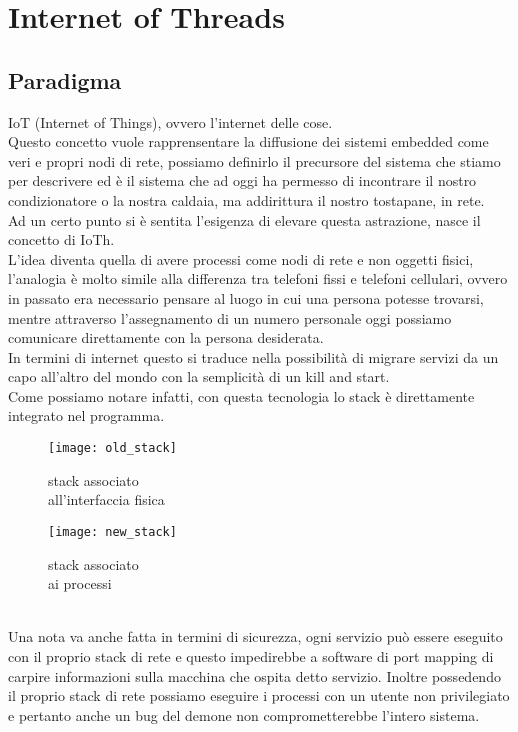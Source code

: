\chapter{Internet of Threads}                %
\lhead[\fancyplain{}{\bfseries\thepage}]{\fancyplain{}{\bfseries\rightmark}}
\section{Paradigma}                 %
IoT (Internet of Things), ovvero l'internet delle cose.\\
Questo concetto vuole rapprensentare la diffusione dei sistemi embedded come veri e propri nodi di rete, possiamo definirlo il precursore del sistema che stiamo per descrivere ed \`e il sistema che ad oggi ha permesso di incontrare il nostro condizionatore o la nostra caldaia, ma addirittura il nostro tostapane, in rete.\\
Ad un certo punto si \`e sentita l'esigenza di elevare questa astrazione, nasce il concetto di IoTh.\\
L'idea diventa quella di avere processi come nodi di rete e non oggetti fisici, l'analogia \`e molto simile alla differenza tra telefoni fissi e telefoni cellulari, ovvero in passato era necessario pensare al luogo in cui una persona potesse trovarsi, mentre attraverso l'assegnamento di un numero personale oggi possiamo comunicare direttamente con la persona desiderata\cite{K1,K2}.\\
In termini di internet questo si traduce nella possibilit\`a di migrare servizi da un capo all'altro del mondo con la semplicit\`a di un kill and start.\\
Come possiamo notare infatti, con questa tecnologia lo stack \`e direttamente integrato nel programma.
\begin{figure}[h]
\centering
\begin{minipage}{.5\textwidth}
\centering
\texttt{[image: old\_stack]}
\caption[physical interface stack]{stack associato\\ all'interfaccia fisica}\label{fig:fisical}
\end{minipage}%
\begin{minipage}{.5\textwidth}
\centering
\texttt{[image: new\_stack]}
\caption[virtual stack]{stack associato\\ ai processi}\label{fig:virtual}
\end{minipage}
\end{figure}\\
Una nota va anche fatta in termini di sicurezza, ogni servizio pu\`o essere eseguito con il proprio stack di rete e questo impedirebbe a software di port mapping di carpire informazioni sulla macchina che ospita detto servizio. Inoltre possedendo il proprio stack di rete possiamo eseguire i processi con un utente non privilegiato e pertanto anche un bug del demone non comprometterebbe l'intero sistema.


